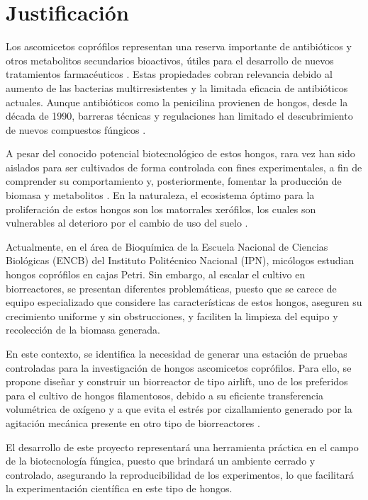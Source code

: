 \chapter{Justificación}\label{cap2}

Los ascomicetos coprófilos representan una reserva importante de antibióticos y
otros metabolitos secundarios bioactivos, útiles para el desarrollo de nuevos
tratamientos farmacéuticos \cite{Bills2013}. Estas propiedades cobran relevancia debido al
aumento de las bacterias multirresistentes y la limitada eficacia de antibióticos
actuales. Aunque antibióticos como la penicilina provienen de hongos, desde la
década de 1990, barreras técnicas y regulaciones han limitado el descubrimiento
de nuevos compuestos fúngicos \cite{Correia2023}.

A pesar del conocido potencial biotecnológico de estos hongos, rara vez han sido
aislados para ser cultivados de forma controlada con fines experimentales, a fin de
comprender su comportamiento y, posteriormente, fomentar la producción de
biomasa y metabolitos \cite{MarinFelix}. En la naturaleza, el ecosistema óptimo para la
proliferación de estos hongos son los matorrales xerófilos, los cuales son
vulnerables al deterioro por el cambio de uso del suelo \cite{Sanchez2004}.

Actualmente, en el área de Bioquímica de la Escuela Nacional de Ciencias
Biológicas (ENCB) del Instituto Politécnico Nacional (IPN), micólogos estudian
hongos coprófilos en cajas Petri. Sin embargo, al escalar el cultivo en biorreactores,
se presentan diferentes problemáticas, puesto que se carece de equipo
especializado que considere las características de estos hongos, aseguren su
crecimiento uniforme y sin obstrucciones, y faciliten la limpieza del equipo y
recolección de la biomasa generada.

En este contexto, se identifica la necesidad de generar una estación de pruebas
controladas para la investigación de hongos ascomicetos coprófilos. Para ello, se
propone diseñar y construir un biorreactor de tipo airlift, uno de los preferidos para
el cultivo de hongos filamentosos, debido a su eficiente transferencia volumétrica
de oxígeno y a que evita el estrés por cizallamiento generado por la agitación
mecánica presente en otro tipo de biorreactores \cite{Cerrone2025}.

El desarrollo de este proyecto representará una herramienta práctica en el campo
de la biotecnología fúngica, puesto que brindará un ambiente cerrado y controlado,
asegurando la reproducibilidad de los experimentos, lo que facilitará la
experimentación científica en este tipo de hongos.

